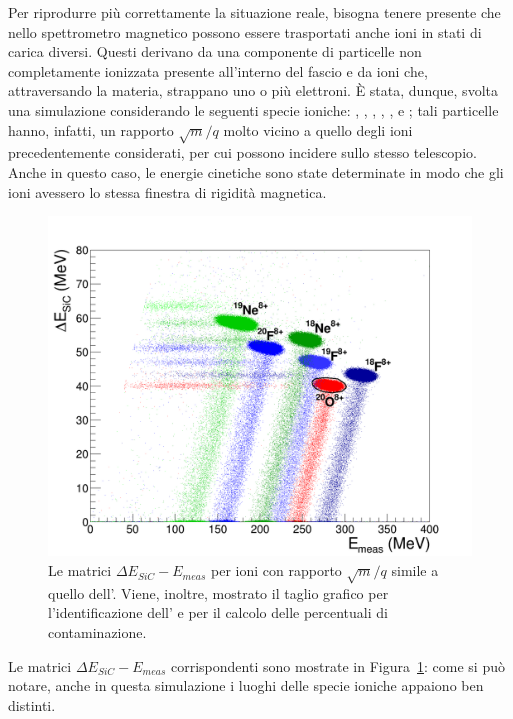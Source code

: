Per riprodurre più correttamente la situazione reale, bisogna tenere presente che nello spettrometro magnetico possono essere trasportati anche ioni in stati di carica diversi. 
Questi derivano da una componente di particelle non completamente ionizzata presente all'interno del fascio e da ioni che, attraversando la materia, strappano uno o più elettroni.
È stata, dunque, svolta una simulazione considerando le seguenti specie ioniche: , , , , ,  e ; tali particelle hanno, infatti, un rapporto $\sqrt{m}/q$ molto vicino a quello degli ioni precedentemente considerati, per cui possono incidere sullo stesso telescopio.
Anche in questo caso, le energie cinetiche sono state determinate in modo che gli ioni avessero lo stessa finestra di rigidità magnetica.
\begin{figure} [!p]
	\centering
	\includegraphics[width=\textwidth, keepaspectratio]{Grafici_Tesi2/PID/deltaE_Emeas_stati_carica_taglio2.png}
	\caption{Le matrici $\Delta E_{SiC} - E_{meas}$ per ioni con rapporto $\sqrt{m}/q$ simile a quello dell'. Viene, inoltre, mostrato il taglio grafico per l'identificazione dell' e per il calcolo delle percentuali di contaminazione.} \label{fig:deltaE_Emeas_PID_stati_carica}
\end{figure} 
Le matrici $\Delta E_{SiC} - E_{meas}$ corrispondenti sono mostrate in Figura~\ref{fig:deltaE_Emeas_PID_stati_carica}: come si può notare, anche in questa simulazione i luoghi delle specie ioniche appaiono ben distinti.
